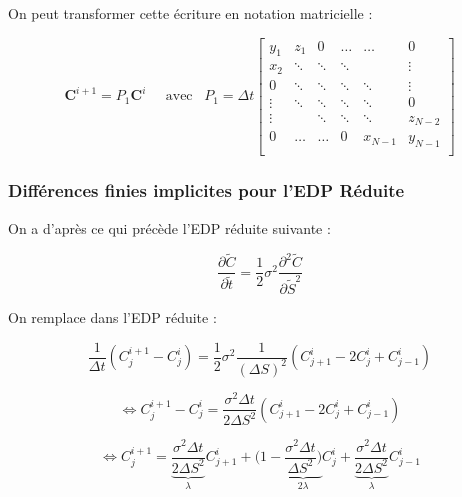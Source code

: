 \documentclass[11pt,a4paper]{article}
\begin{document}
\vspace{0.5cm}

On peut transformer cette écriture en notation matricielle :

\vspace{0.5cm}

$$  \textbf{C}^{i+1} = P_{1}\textbf{C}^{i} \;\;\;\;\; \textrm{avec} \;\;\; P_{1} = \Delta t \begin{bmatrix}
y_{1} & z_{1} & 0 & \dots & \dots & 0\\
x_{2} & \ddots & \ddots & \ddots &  & \vdots\\
0 & \ddots & \ddots & \ddots & \ddots & \vdots\\
\vdots & \ddots & \ddots & \ddots & \ddots & 0\\
\vdots &  & \ddots & \ddots & \ddots & z_{N-2}\\
0 & \dots & \dots & 0 & x_{N-1} & y_{N-1}\\
\end{bmatrix}$$

\subsubsection{Différences finies implicites pour l'EDP Réduite}

On a d'après ce qui précède l'EDP réduite suivante :

\vspace{0.5cm}

$$\frac{\partial \widetilde{C}}{\partial \widetilde{t}} = \frac{1}{2} \sigma^2 \frac{\partial^{2} \widetilde{C}}{\partial \widetilde{S}^{2}}$$

\vspace{0.5cm}

On remplace dans l'EDP réduite :

\vspace{0.5cm}

$$\frac{1}{\Delta t} (C_{j}^{i+1} - C_{j}^{i}) = \frac{1}{2} \sigma^2 \frac{1}{(\Delta S)^2} (C_{j+1}^{i} -2C_{j}^{i} + C_{j-1}^{i})$$

$$\Leftrightarrow  C_{j}^{i+1} - C_{j}^{i} = \frac{\sigma^2 \Delta t}{2 \Delta S^{2}}(C_{j+1}^{i} -2C_{j}^{i} + C_{j-1}^{i})$$

$$\Leftrightarrow  C_{j}^{i+1} = \underbrace{\frac{\sigma^2 \Delta t}{2 \Delta S^{2}}}_{\lambda} C_{j+1}^{i} + (1 - \underbrace{\frac{\sigma^2 \Delta t}{\Delta S^{2}})}_{2 \lambda} C_{j}^{i} + \underbrace{\frac{\sigma^2 \Delta t}{2 \Delta S^{2}}}_{\lambda} C_{j-1}^{i}$$
\end{document}
